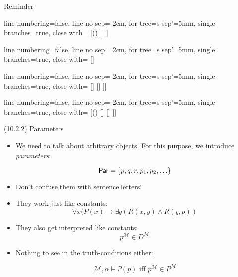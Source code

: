 \begin{frame}{Reminder}
\begin{center}
					\begin{prooftree}
					{
					line numbering=false,
					line no sep= 2cm,
					for tree={s sep'=5mm},
					single branches=true,
					close with=\xmark
					}
					[\neg (\phi\to\psi) [\phi [\neg \psi ] ] ]
					\end{prooftree}
					\begin{prooftree}
					{
					line numbering=false,
					line no sep= 2cm,
					for tree={s sep'=5mm},
					single branches=true,
					close with=\xmark
					}
					[\phi\to\psi [\neg \phi ] [\psi ] ]
					\end{prooftree}
					\begin{prooftree}
					{
					line numbering=false,
					line no sep= 2cm,
					for tree={s sep'=5mm},
					single branches=true,
					close with=\xmark
					}
					[\phi\leftrightarrow \psi [\phi [\psi] ] [\neg \phi [\neg \psi] ] ]]
					\end{prooftree}
					\begin{prooftree}
					{
					line numbering=false,
					line no sep= 2cm,
					for tree={s sep'=5mm},
					single branches=true,
					close with=\xmark
					}
					[\neg(\phi\leftrightarrow \psi) [\phi [\neg \psi] ] [\neg \phi [ \psi] ] ]]
					\end{prooftree}

				\end{center}
				
				

\end{frame}

\begin{frame}{(10.2.2) Parameters}

	\begin{itemize}
		
		\item We need to talk about arbitrary objects. For this purpose, we introduce \emph{parameters}:
		
		\[\mathsf{Par}=\{p,q,r,p_1, p_2, \mathellipsis\}\]
		
		\item Don't confuse them with sentence letters!
		
		\item They work just like constants: \[\forall x(P(x)\to \exists y(R(x,y)\land R(y,p))\]
		
		\item They also get interpreted like constants: \[p^\mathcal{M}\in D^\mathcal{M}\]
		
		\item Nothing to see in the truth-conditions either:
		
		\[\mathcal{M},\alpha\vDash P(p)\text{ iff }p^\mathcal{M}\in P^\mathcal{M}\]
	
	\end{itemize}


\end{frame}

